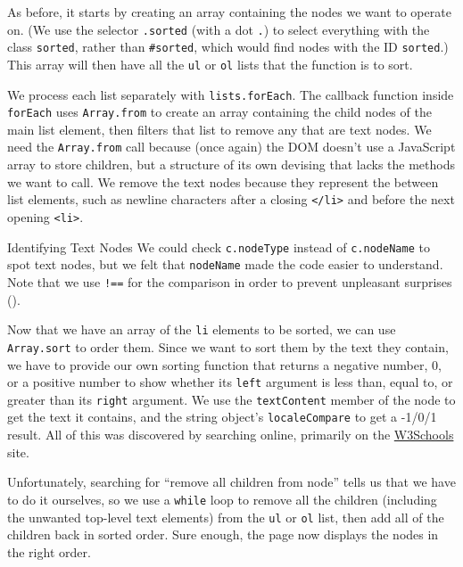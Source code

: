 As before,
it starts by creating an array containing the nodes we want to operate on.
(We use the selector \texttt{.sorted} (with a dot \texttt{.}) to select everything with the class \texttt{sorted},
rather than \texttt{\#sorted},
which would find nodes with the ID \texttt{sorted}.)
This array will then have all the \texttt{ul} or \texttt{ol} lists that the function is to sort.

We process each list separately with \texttt{lists.forEach}.
The callback function inside \texttt{forEach}
uses \texttt{Array.from} to create an array containing the child nodes of the main list element,
then filters that list to remove any that are text nodes.
We need the \texttt{Array.from} call because (once again) the DOM doesn't use a JavaScript array to store children,
but a structure of its own devising that lacks the methods we want to call.
We remove the text nodes because they represent the  between list elements,
such as newline characters after a closing \texttt{{\textless}/li{\textgreater}} and before the next opening \texttt{{\textless}li{\textgreater}}.

\begin{aside}{Identifying Text Nodes}
  We could check \texttt{c.nodeType} instead of \texttt{c.nodeName} to spot text nodes,
  but we felt that \texttt{nodeName} made the code easier to understand.
  Note that we use \texttt{!==} for the comparison
  in order to prevent unpleasant surprises ().
\end{aside}

Now that we have an array of the \texttt{li} elements to be sorted,
we can use \texttt{Array.sort} to order them.
Since we want to sort them by the text they contain,
we have to provide our own sorting function
that returns a negative number, 0, or a positive number to show whether its \texttt{left} argument is less than,
equal to,
or greater than its \texttt{right} argument.
We use the \texttt{textContent} member of the node to get the text it contains,
and the string object's \texttt{localeCompare} to get a -1/0/1 result.
All of this was discovered by searching online,
primarily on the \href{https://www.w3schools.com/}{W3Schools} site.

Unfortunately,
searching for ``remove all children from node'' tells us that we have to do it ourselves,
so we use a \texttt{while} loop to remove all the children
(including the unwanted top-level text elements)
from the \texttt{ul} or \texttt{ol} list,
then add all of the children back in sorted order.
Sure enough,
the page now displays the nodes in the right order.

